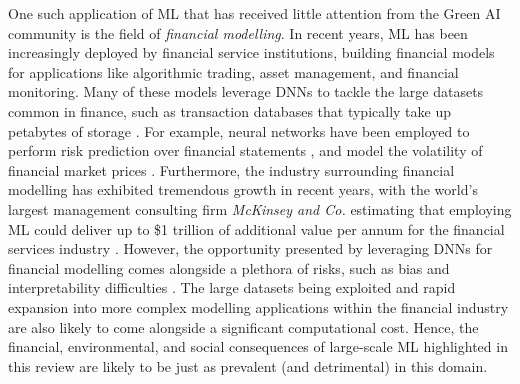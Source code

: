 \documentclass[a4paper, 12pt]{article}
\begin{document}
    One such application of ML that has received little attention from the Green AI community is the field of \emph{financial modelling}. In recent years, ML has been increasingly deployed by financial service institutions, building financial models for applications like algorithmic trading, asset management, and financial monitoring. Many of these models leverage DNNs to tackle the large datasets common in finance, such as transaction databases that typically take up petabytes of storage \citep{oecd-2021}. For example, neural networks have been employed to perform risk prediction over financial statements \citep{green-choi-1997}, and model the volatility of financial market prices \citep{cao-2019}. Furthermore, the industry surrounding financial modelling has exhibited tremendous growth in recent years, with the world's largest management consulting firm \emph{McKinsey and Co.} estimating that employing ML could deliver up to \$1 trillion of additional value per annum for the financial services industry \citep{kumar-2022}. However, the opportunity presented by leveraging DNNs for financial modelling comes alongside a plethora of risks, such as bias and interpretability difficulties \citep{laplante-2019}. The large datasets being exploited and rapid expansion into more complex modelling applications within the financial industry are also likely to come alongside a significant computational cost. Hence, the financial, environmental, and social consequences of large-scale ML highlighted in this review are likely to be just as prevalent (and detrimental) in this domain. 
\end{document}
